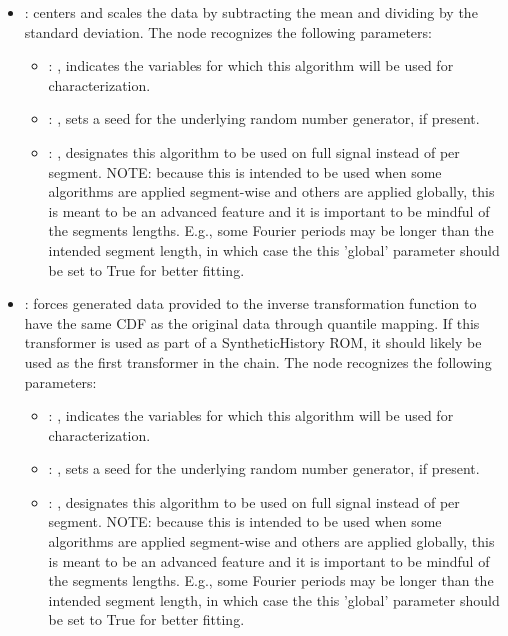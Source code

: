 \begin{itemize}
    \item {}:
      centers and scales the data by subtracting the mean and dividing by     the standard
      deviation.
      The  node recognizes the following parameters:
        \begin{itemize}
          \item {}: , 
            indicates the variables for which this algorithm will be used for characterization.
          \item {}: , 
            sets a seed for the underlying random number generator, if present.
          \item {}: , 
            designates this algorithm to be used on full signal instead of per
            segment. NOTE: because this is intended to be used when some algorithms are
            applied segment-wise and others are applied globally, this is meant to be an
            advanced feature and it is important to be mindful of the segments lengths.
            E.g., some Fourier periods may be longer than the intended segment length, in
            which case the this 'global' parameter should be set to True for better
            fitting. 
      \end{itemize}

    \item {}:
      forces generated data provided to the inverse transformation function to
      have the same CDF as the original data through quantile mapping. If this
      transformer is used as part of a SyntheticHistory ROM, it should likely
      be used as the first transformer in the chain.
      The  node recognizes the following parameters:
        \begin{itemize}
          \item {}: , 
            indicates the variables for which this algorithm will be used for characterization.
          \item {}: , 
            sets a seed for the underlying random number generator, if present.
          \item {}: , 
            designates this algorithm to be used on full signal instead of per
            segment. NOTE: because this is intended to be used when some algorithms are
            applied segment-wise and others are applied globally, this is meant to be an
            advanced feature and it is important to be mindful of the segments lengths.
            E.g., some Fourier periods may be longer than the intended segment length, in
            which case the this 'global' parameter should be set to True for better
            fitting. 
      \end{itemize}


\end{itemize}
